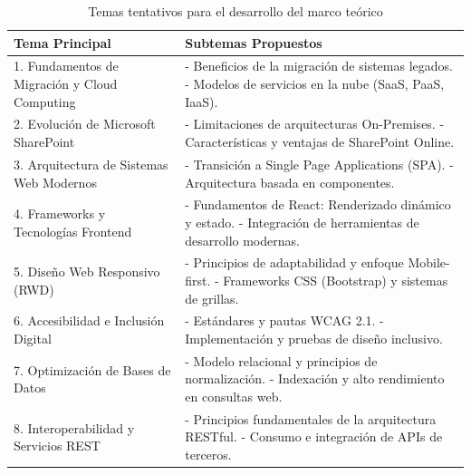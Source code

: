 \begin{table}[H]
\centering
\caption{Temas tentativos para el desarrollo del marco teórico}
\label{tab:temas_tentativos}
\renewcommand{\arraystretch}{1.5}
\begin{tabular}{|p{5.5cm}|p{8.5cm}|}
\hline
\textbf{Tema Principal} & \textbf{Subtemas Propuestos} \\
\hline
1. Fundamentos de Migración y Cloud Computing & 
- Beneficios de la migración de sistemas legados. \newline
- Modelos de servicios en la nube (SaaS, PaaS, IaaS). \\
\hline
2. Evolución de Microsoft SharePoint & 
- Limitaciones de arquitecturas On-Premises. \newline
- Características y ventajas de SharePoint Online. \\
\hline
3. Arquitectura de Sistemas Web Modernos & 
- Transición a Single Page Applications (SPA). \newline
- Arquitectura basada en componentes. \\
\hline
4. Frameworks y Tecnologías Frontend & 
- Fundamentos de React: Renderizado dinámico y estado. \newline
- Integración de herramientas de desarrollo modernas. \\
\hline
5. Diseño Web Responsivo (RWD) & 
- Principios de adaptabilidad y enfoque Mobile-first. \newline
- Frameworks CSS (Bootstrap) y sistemas de grillas. \\
\hline
6. Accesibilidad e Inclusión Digital & 
- Estándares y pautas WCAG 2.1. \newline
- Implementación y pruebas de diseño inclusivo. \\
\hline
7. Optimización de Bases de Datos & 
- Modelo relacional y principios de normalización. \newline
- Indexación y alto rendimiento en consultas web. \\
\hline
8. Interoperabilidad y Servicios REST & 
- Principios fundamentales de la arquitectura RESTful. \newline
- Consumo e integración de APIs de terceros. \\
\hline
\end{tabular}
\end{table}


